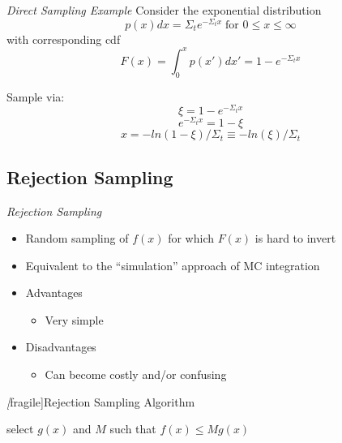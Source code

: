 \emph{Direct Sampling Example}
  Consider the exponential distribution
  \begin{equation*}
     p(x)dx = \Sigma_{t} e^{-\Sigma_{t} x} \; \textrm{for $0 \le x \le \infty $}
  \end{equation*}
  with corresponding cdf
  \begin{equation*}
     F(x) = \int_{0}^{x} p(x')dx' = 1 - e^{-\Sigma_{t} x}
  \end{equation*}

 Sample via:
  \begin{equation*}
    \xi = 1 - e^{-\Sigma_{t} x}
  \end{equation*}
  \begin{equation*}
    e^{-\Sigma_{t} x} = 1 - \xi
  \end{equation*}
  \begin{equation*}
    x = -ln(1-\xi) / \Sigma_{t} \equiv -ln(\xi) / \Sigma_{t}
  \end{equation*}


\subsection{Rejection Sampling}
\emph{Rejection Sampling}
   \begin{itemize}
       \item Random sampling of $f(x)$ for which $F(x)$ is hard to invert
       \item Equivalent to the ``simulation'' approach of MC integration
   
       \item Advantages
          \begin{itemize}
              \item Very simple
          \end{itemize}
   
       \item Disadvantages
          \begin{itemize}
              \item Can become costly and/or confusing
          \end{itemize}         
   \end{itemize}


\emph[fragile]{Rejection Sampling Algorithm}

\begin{algorithm}[H]
    select $g(x)$ and $M$ such that $f(x) \leq Mg(x)$\;
\end{algorithm}




